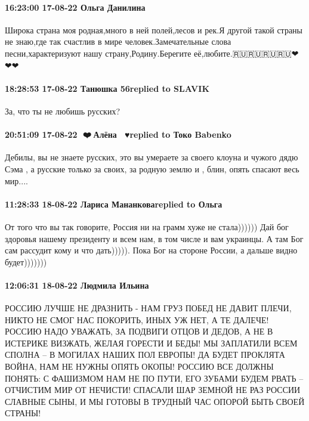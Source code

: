 \paragraph{16:23:00 17-08-22 Ольга Данилина}

Широка страна моя родная,много в ней полей,лесов и рек.Я другой такой страны не
знаю,где так счастлив в мире человек.Замечательные слова песни,характеризуют
нашу страну,Родину.Берегите её,любите.🇷🇺🇷🇺🇷🇺🇷🇺❤❤❤

\paragraph{18:28:53 17-08-22 Танюшка 56replied to SLAVIK}

За, что ты не любишь русских?

\paragraph{20:51:09 17-08-22 🖤❤️💛Алёна 🤍💙♥️replied to Токо Babenko}

Дебилы, вы не знаете русских, это вы умераете за своего клоуна и чужого дядю
Сэма , а русские только за своих, за родную землю и , блин, опять спасают весь
мир....

\paragraph{11:28:33 18-08-22 Лариса Мананковаreplied to Ольга}

От того что вы так говорите, Россия ни на грамм хуже не стала)))))) Дай бог
здоровья нашему президенту и всем нам, в том числе и вам украинцы. А там Бог
сам рассудит кому и что дать))))). Пока Бог на стороне России, а дальше видно
будет)))))))

\paragraph{12:06:31 18-08-22 Людмила Ильина}

\obeycr
РОССИЮ ЛУЧШЕ НЕ ДРАЗНИТЬ -
НАМ ГРУЗ ПОБЕД НЕ ДАВИТ ПЛЕЧИ,
НИКТО НЕ СМОГ НАС ПОКОРИТЬ,
ИНЫХ УЖ НЕТ, А ТЕ ДАЛЕЧЕ!
РОССИЮ НАДО УВАЖАТЬ,
ЗА ПОДВИГИ ОТЦОВ И ДЕДОВ,
А НЕ В ИСТЕРИКЕ ВИЗЖАТЬ,
ЖЕЛАЯ ГОРЕСТИ И БЕДЫ!
МЫ ЗАПЛАТИЛИ ВСЕМ СПОЛНА –
В МОГИЛАХ НАШИХ ПОЛ ЕВРОПЫ!
ДА БУДЕТ ПРОКЛЯТА ВОЙНА,
НАМ НЕ НУЖНЫ ОПЯТЬ ОКОПЫ!
РОССИЮ ВСЕ ДОЛЖНЫ ПОНЯТЬ:
С ФАШИЗМОМ НАМ НЕ ПО ПУТИ,
ЕГО ЗУБАМИ БУДЕМ РВАТЬ –
ОТЧИСТИМ МИР ОТ НЕЧИСТИ!
СПАСАЛИ ШАР ЗЕМНОЙ НЕ РАЗ
РОССИИ СЛАВНЫЕ СЫНЫ,
И МЫ ГОТОВЫ В ТРУДНЫЙ ЧАС
ОПОРОЙ БЫТЬ СВОЕЙ СТРАНЫ!
\restorecr

